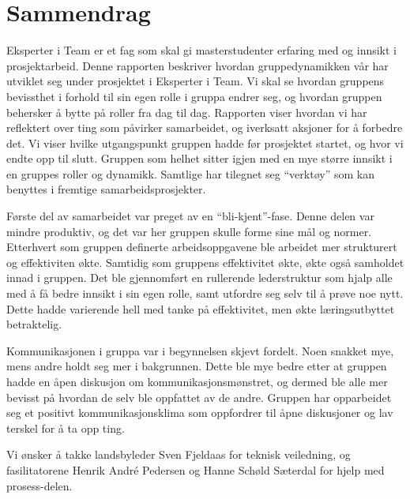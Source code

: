 \chapter*{Sammendrag}
Eksperter i Team er et fag som skal gi masterstudenter erfaring med og innsikt i prosjektarbeid.
Denne rapporten beskriver hvordan gruppedynamikken vår har utviklet seg under prosjektet i Eksperter i Team.
Vi skal se hvordan gruppens bevissthet i forhold til sin egen rolle i gruppa endrer seg, og hvordan gruppen behersker å bytte på roller fra dag til dag.
Rapporten viser hvordan vi har reflektert over ting som påvirker samarbeidet, og iverksatt aksjoner for å forbedre det. 
Vi viser hvilke utgangspunkt gruppen hadde før prosjektet startet, og hvor vi endte opp til slutt. 
Gruppen som helhet sitter igjen med en mye større innsikt i en gruppes roller og dynamikk. 
Samtlige har tilegnet seg ``verktøy'' som kan benyttes i fremtige samarbeidsprosjekter.
\vspace{\secspace}

Første del av samarbeidet var preget av en ``bli-kjent''-fase.
Denne delen var mindre produktiv, og det var her gruppen skulle forme sine mål og normer. 
Etterhvert som gruppen definerte arbeidsoppgavene ble arbeidet mer strukturert og effektiviten økte. 
Samtidig som gruppens effektivitet økte, økte også samholdet innad i gruppen. 
Det ble gjennomført en rullerende lederstruktur som hjalp alle med å få bedre innsikt i sin egen rolle, samt utfordre seg selv til å prøve noe nytt. 
Dette hadde varierende hell med tanke på effektivitet, men økte læringsutbyttet betraktelig. 
\vspace{\secspace}

Kommunikasjonen i gruppa var i begynnelsen skjevt fordelt. 
Noen snakket mye, mens andre holdt seg mer i bakgrunnen. 
Dette ble mye bedre etter at gruppen hadde en åpen diskusjon om kommunikasjonsmønstret, og dermed ble alle mer bevisst på hvordan de selv ble oppfattet av de andre. 
Gruppen har opparbeidet seg et positivt kommunikasjonsklima som oppfordrer til åpne diskusjoner og lav terskel for å ta opp ting. 

\vfill
\begin{center}
Vi ønsker å takke landsbyleder Sven Fjeldaas for teknisk veiledning, og fasilitatorene Henrik André Pedersen og Hanne Schøld Sæterdal for hjelp med prosess-delen.
\end{center}
